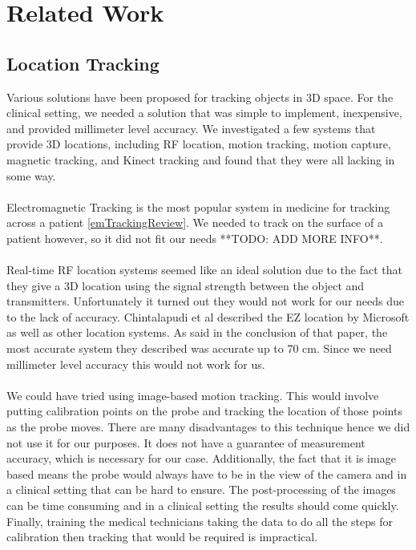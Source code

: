 \section{Related Work}

\subsection{Location Tracking}

Various solutions have been proposed for tracking objects in 3D space. For the clinical setting, we needed a solution that was simple to implement, inexpensive, and provided millimeter level accuracy. We investigated a few systems that provide 3D locations, including RF location, motion tracking, motion capture, magnetic tracking, and Kinect tracking and found that they were all lacking in some way. \\
\\
Electromagnetic Tracking is the most popular system in medicine for tracking across a patient \ref{emTrackingReview}. We needed to track on the surface of a patient however, so it did not fit our needs **TODO: ADD MORE INFO**. \\
\\
Real-time RF location systems seemed like an ideal solution due to the fact that they give a 3D location using the signal strength between the object and transmitters. Unfortunately it turned out they would not work for our needs due to the lack of accuracy. Chintalapudi et al \cite{ezlocation} described the EZ location by Microsoft as well as other location systems. As said in the conclusion of that paper, the most accurate system they described was accurate up to 70 cm. Since we need millimeter level accuracy this would not work for us. \\
\\
We could have tried using image-based motion tracking. This would involve putting calibration points on the probe and tracking the location of those points as the probe moves. There are many disadvantages to this technique hence we did not use it for our purposes. It does not have a guarantee of measurement accuracy, which is necessary for our case. Additionally, the fact that it is image based means the probe would always have to be in the view of the camera and in a clinical setting that can be hard to ensure. The post-processing of the images can be time consuming and in a clinical setting the results should come quickly. Finally, training the medical technicians taking the data to do all the steps for calibration then tracking that would be required is impractical. \\
